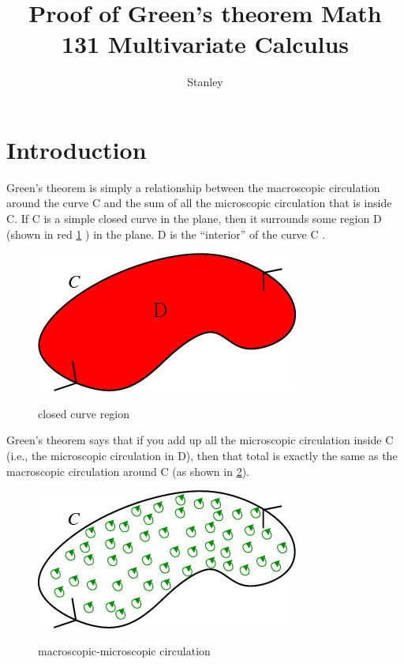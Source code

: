 \documentclass[10pt,a4paper]{article}
\author{Stanley}
\title{Proof of Green’s theorem
	Math 131 Multivariate Calculus}
\begin{document}
	\maketitle
{}
\tableofcontents

\newpage
\section{Introduction}
 Green's theorem is simply a relationship between the macroscopic circulation around the curve C and the sum of all the microscopic circulation that is inside C. If C is a simple closed curve in the plane, then it surrounds some region D (shown in red \ref{closed curve region.png} ) in the plane. D is the “interior” of the curve C \cite{cite2}.
\begin{figure}[h!]
	\centering
	
\includegraphics[scale=0.2]{closed_curve_region.png}
\label{closed curve region.png}
\caption{closed curve region}
\end{figure}
Green's theorem says that if you add up all the microscopic circulation inside C (i.e., the microscopic circulation in D), then that total is exactly the same as the macroscopic circulation around C (as shown in \ref{macroscopic_microscopic_circulation.png}).
\begin{figure}[h!]
	\centering
	
	\includegraphics[scale=0.2]{macroscopic_microscopic_circulation.png}
	\label{macroscopic_microscopic_circulation.png}
	\caption{macroscopic-microscopic circulation}
\end{figure} 
\end{document}
